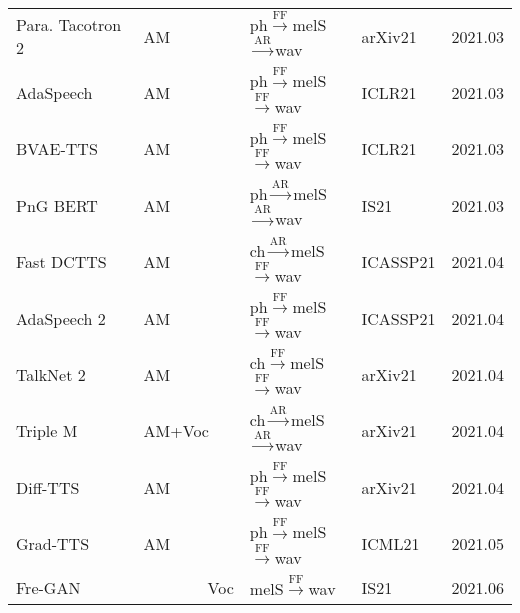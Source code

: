 \documentclass{article}
\begin{document}
\begin{center}
\begin{longtable}{l | l | l | l | l }
		Para. Tacotron 2~\cite{elias2021parallel}    & AM       & {\color{blue}ph}$\stackrel{\text{FF}}{\longrightarrow}${\color{red}melS}$\stackrel{\text{AR}}{\longrightarrow}$wav                 &arXiv21 & 2021.03         \\
		AdaSpeech~\cite{chen2021adaspeech}            & AM       &{\color{blue}ph}$\stackrel{\text{FF}}{\longrightarrow}${\color{red}melS}$\stackrel{\text{FF}}{\longrightarrow}$wav     & ICLR21& 2021.03        \\
		BVAE-TTS~\cite{lee2020bidirectional}            & AM       &{\color{blue}ph}$\stackrel{\text{FF}}{\longrightarrow}${\color{red}melS}$\stackrel{\text{FF}}{\longrightarrow}$wav     & ICLR21& 2021.03        \\
		PnG BERT~\cite{jia2021png}            & AM       &{\color{blue}ph}$\stackrel{\text{AR}}{\longrightarrow}${\color{red}melS}$\stackrel{\text{AR}}{\longrightarrow}$wav     & IS21 & 2021.03        \\
        Fast DCTTS~\cite{kang2021fast} & AM       &{\color{blue}ch}$\stackrel{\text{AR}}{\longrightarrow}${\color{red}melS}$\stackrel{\text{FF}}{\longrightarrow}$wav     & ICASSP21 & 2021.04        \\
        AdaSpeech 2~\cite{yan2021adaspeech}           & AM       &{\color{blue}ph}$\stackrel{\text{FF}}{\longrightarrow}${\color{red}melS}$\stackrel{\text{FF}}{\longrightarrow}$wav     & ICASSP21 & 2021.04        \\
        TalkNet 2~\cite{beliaev2021talknet}              & AM       &  {\color{blue}ch}$\stackrel{\text{FF}}{\longrightarrow}${\color{red}melS}$\stackrel{\text{FF}}{\longrightarrow}$wav             &arXiv21& 2021.04     \\
        Triple M~\cite{lin2021triple}      & AM+Voc       &  {\color{blue}ch}$\stackrel{\text{AR}}{\longrightarrow}${\color{red}melS}$\stackrel{\text{AR}}{\longrightarrow}$wav             &arXiv21& 2021.04     \\
		Diff-TTS~\cite{jeong2021diff}            & AM       &{\color{blue}ph}$\stackrel{\text{FF}}{\longrightarrow}${\color{red}melS}$\stackrel{\text{FF}}{\longrightarrow}$wav     & arXiv21& 2021.04        \\
		Grad-TTS~\cite{popov2021grad}            & AM       &{\color{blue}ph}$\stackrel{\text{FF}}{\longrightarrow}${\color{red}melS}$\stackrel{\text{FF}}{\longrightarrow}$wav     & ICML21 & 2021.05        \\
		Fre-GAN~\cite{kim2021fre}               & ~~~~~~~~Voc      & {\color{red}melS}$\stackrel{\text{FF}}{\longrightarrow}$wav   &IS21  & 2021.06    \\

\end{longtable}
\end{center}
\end{document}
